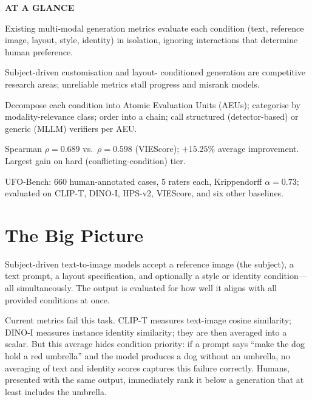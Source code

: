 \documentclass[10pt,twocolumn]{article}
\begin{document}
\begin{mdframed}[backgroundcolor=boxgray,linecolor=rulered,linewidth=1pt,
    innerleftmargin=6pt,innerrightmargin=6pt,
    innertopmargin=6pt,innerbottommargin=6pt]
\textbf{\small AT A GLANCE}\par\vspace{4pt}
\begin{description}[leftmargin=0pt,labelsep=4pt,itemsep=2pt,parsep=0pt,
    font=\small\bfseries]
  \item[Problem:] Existing multi-modal generation metrics evaluate each
    condition (text, reference image, layout, style, identity) in
    isolation, ignoring interactions that determine human preference.
  \item[Why it matters:] Subject-driven customisation and layout-
    conditioned generation are competitive research areas; unreliable
    metrics stall progress and misrank models.
  \item[Method:] Decompose each condition into Atomic Evaluation Units
    (AEUs); categorise by modality-relevance class; order into a chain;
    call structured (detector-based) or generic (MLLM) verifiers per AEU.
  \item[Result:] Spearman $\rho=0.689$ vs.\ $\rho=0.598$ (VIEScore);
    $+15.25\%$ average improvement. Largest gain on hard
    (conflicting-condition) tier.
  \item[Evidence:] UFO-Bench: 660 human-annotated cases, 5 raters each,
    Krippendorff $\alpha{=}0.73$; evaluated on CLIP-T, DINO-I, HPS-v2,
    VIEScore, and six other baselines.
\end{description}
\end{mdframed}

\section{The Big Picture}

Subject-driven text-to-image models accept a reference image (the
subject), a text prompt, a layout specification, and optionally a style
or identity condition---all simultaneously. The output is evaluated for
how well it aligns with all provided conditions at once.

Current metrics fail this task. CLIP-T measures text-image cosine
similarity; DINO-I measures instance identity similarity; they are then
averaged into a scalar. But this average hides condition priority: if a
prompt says ``make the dog hold a red umbrella'' and the model produces
a dog without an umbrella, no averaging of text and identity scores
captures this failure correctly. Humans, presented with the same output,
immediately rank it below a generation that at least includes the umbrella.
\end{document}
